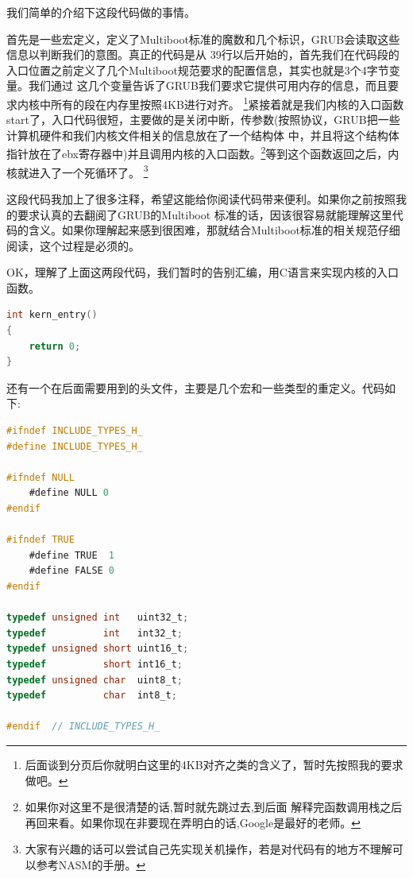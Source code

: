 \par 我们简单的介绍下这段代码做的事情。
\par 首先是一些宏定义，定义了Multiboot标准的魔数和几个标识，GRUB会读取这些信息以判断我们的意图。真正的代码是从\allowbreak
39行以后开始的，首先我们在代码段的入口位置之前定义了几个Multiboot规范要求的配置信息，其实也就是3个4字节变量。我们通过\allowbreak
这几个变量告诉了GRUB我们要求它提供可用内存的信息，而且要求内核中所有的段在内存里按照4KB进行对齐。\allowbreak
\footnote{后面谈到分页后你就明白这里的4KB对齐之类的含义了，暂时先按照我的要求做吧。}紧接着就是我们内核的入口函数\allowbreak
start了，入口代码很短，主要做的是关闭中断，传参数(按照协议，GRUB把一些计算机硬件和我们内核文件相关的信息放在了一个结构体\allowbreak
中，并且将这个结构体指针放在了ebx寄存器中)并且调用内核的入口函数。\footnote{如果你对这里不是很清楚的话,暂时就先跳过去,到后面\allowbreak
解释完函数调用栈之后再回来看。如果你现在非要现在弄明白的话,Google是最好的老师。}等到这个函数返回之后，内核就进入了一个死循环了。\allowbreak
\footnote{大家有兴趣的话可以尝试自己先实现关机操作，若是对代码有的地方不理解可以参考NASM的手册。}

\par 这段代码我加上了很多注释，希望这能给你阅读代码带来便利。如果你之前按照我的要求认真的去翻阅了GRUB的Multiboot\allowbreak
标准的话，因该很容易就能理解这里代码的含义。如果你理解起来感到很困难，那就结合Multiboot标准的相关规范仔细阅读，这个过程是必须的。

\par OK，理解了上面这两段代码，我们暂时的告别汇编，用C语言来实现内核的入口函数。

\begin{lstlisting}[language = C, label = init/entry.c, caption = init/entry.c]
int kern_entry()
{
	return 0;
}
\end{lstlisting} 

\par 还有一个在后面需要用到的头文件，主要是几个宏和一些类型的重定义。代码如下:

\begin{lstlisting}[language = C, label = include/types.h, caption = include/types.h]
#ifndef INCLUDE_TYPES_H_
#define INCLUDE_TYPES_H_

#ifndef NULL
	#define NULL 0
#endif

#ifndef TRUE
	#define TRUE  1
	#define FALSE 0
#endif

typedef unsigned int   uint32_t;
typedef          int   int32_t;
typedef unsigned short uint16_t;
typedef          short int16_t;
typedef unsigned char  uint8_t;
typedef          char  int8_t;

#endif 	// INCLUDE_TYPES_H_
\end{lstlisting}

